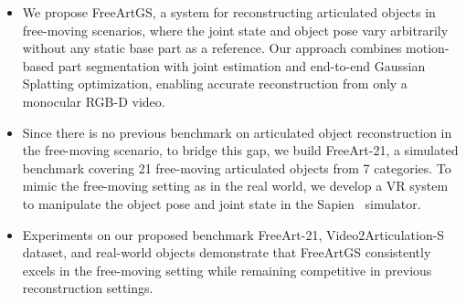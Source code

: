 \begin{itemize}
    \item We propose FreeArtGS, a system for reconstructing articulated objects in free-moving scenarios, where the joint state and object pose vary arbitrarily without any static base part as a reference. Our approach combines motion-based part segmentation with joint estimation and end-to-end Gaussian Splatting optimization, enabling accurate reconstruction from only a monocular RGB-D video.
    \item Since there is no previous benchmark on articulated object reconstruction in the free-moving scenario, to bridge this gap, we build FreeArt-21, a simulated benchmark covering 21 free-moving articulated objects from 7 categories. To mimic the free-moving setting as in the real world, we develop a VR system to manipulate the object pose and joint state in the Sapien~\cite{partnetmobility} simulator.
    \item Experiments on our proposed benchmark FreeArt-21, Video2Articulation-S dataset, and real-world objects demonstrate that FreeArtGS consistently excels in the free-moving setting while remaining competitive in previous reconstruction settings.
\end{itemize}